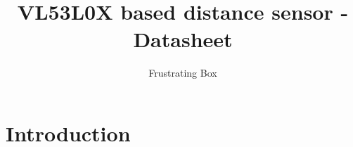 \documentclass[10pt,a4paper]{article}
\author{Frustrating Box}
\title{VL53L0X based distance sensor - Datasheet}
\begin{document}
\section{Introduction}
	
\end{document}
